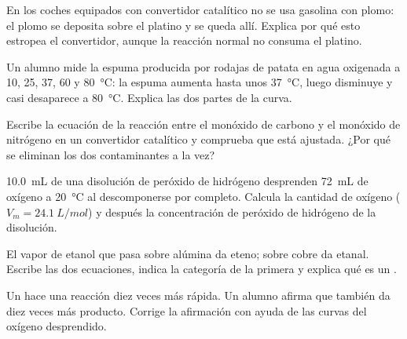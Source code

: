 \begin{exercise}[$\star\star$]\label{exo:g12:catalysis:8}
En los coches equipados con convertidor catalítico no se usa gasolina con
plomo: el plomo se deposita sobre el platino y se queda allí. Explica por
qué esto estropea el convertidor, aunque la reacción normal no consuma el
platino.
\end{exercise}

\begin{exercise}[$\star\star$]\label{exo:g12:catalysis:9}
Un alumno mide la espuma producida por rodajas de patata en agua
oxigenada a 10, 25, 37, 60 y \qty{80}{\celsius}: la espuma aumenta hasta
unos \qty{37}{\celsius}, luego disminuye y casi desaparece a
\qty{80}{\celsius}. Explica las dos partes de la curva.
\end{exercise}

\begin{exercise}[$\star\star$]\label{exo:g12:catalysis:10}
Escribe la ecuación de la reacción entre el monóxido de carbono y el
monóxido de nitrógeno en un convertidor catalítico y comprueba que está
ajustada. ¿Por qué se eliminan los dos contaminantes a la vez?
\end{exercise}

\begin{exercise}[$\star\star$]\label{exo:g12:catalysis:11}
\qty{10.0}{mL} de una disolución de peróxido de hidrógeno desprenden
\qty{72}{mL} de oxígeno a \qty{20}{\celsius} al descomponerse por
completo. Calcula la cantidad de oxígeno ($V_m = \qty{24.1}{L/mol}$) y
después la concentración de peróxido de hidrógeno de la disolución.
\end{exercise}

\begin{exercise}[$\star\star\star$]\label{exo:g12:catalysis:12}
El vapor de etanol que pasa sobre alúmina da eteno; sobre cobre da
etanal. Escribe las dos ecuaciones, indica la categoría de la primera y
explica qué es un .
\end{exercise}

\begin{exercise}[$\star\star\star$]\label{exo:g12:catalysis:13}
Un  hace una reacción diez veces más rápida. Un alumno afirma
que también da diez veces más producto. Corrige la afirmación con ayuda
de las curvas del oxígeno desprendido.
\end{exercise}

